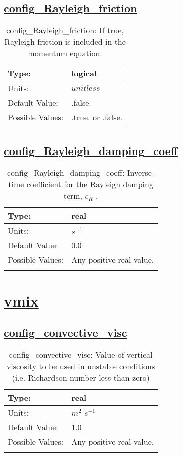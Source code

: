 \subsection[config\_Rayleigh\_friction]{\hyperref[sec:nm_tab_Rayleigh_damping]{config\_Rayleigh\_friction}}
\label{subsec:nm_sec_config_Rayleigh_friction}
\begin{center}
\begin{longtable}{| p{2.0in} | p{4.0in} |}
    \hline
    Type: & logical \\
    \hline
    Units: & $unitless$ \\
    \hline
    Default Value: & .false. \\
    \hline
    Possible Values: & .true. or .false. \\
    \hline
    \caption{config\_Rayleigh\_friction: If true, Rayleigh friction is included in the momentum equation.}
\end{longtable}
\end{center}
\subsection[config\_Rayleigh\_damping\_coeff]{\hyperref[sec:nm_tab_Rayleigh_damping]{config\_Rayleigh\_damping\_coeff}}
\label{subsec:nm_sec_config_Rayleigh_damping_coeff}
\begin{center}
\begin{longtable}{| p{2.0in} | p{4.0in} |}
    \hline
    Type: & real \\
    \hline
    Units: & $s^{-1}$ \\
    \hline
    Default Value: & 0.0 \\
    \hline
    Possible Values: & Any positive real value. \\
    \hline
    \caption{config\_Rayleigh\_damping\_coeff:  Inverse-time coefficient for the Rayleigh damping term,  $c_R$ .}
\end{longtable}
\end{center}
\section[vmix]{\hyperref[sec:nm_tab_vmix]{vmix}}
\label{sec:nm_sec_vmix}
\subsection[config\_convective\_visc]{\hyperref[sec:nm_tab_vmix]{config\_convective\_visc}}
\label{subsec:nm_sec_config_convective_visc}
\begin{center}
\begin{longtable}{| p{2.0in} | p{4.0in} |}
    \hline
    Type: & real \\
    \hline
    Units: & $m^2$ $s^{-1}$ \\
    \hline
    Default Value: & 1.0 \\
    \hline
    Possible Values: & Any positive real value. \\
    \hline
    \caption{config\_convective\_visc: Value of vertical viscosity to be used in unstable conditions (i.e. Richardson number less than zero)}
\end{longtable}
\end{center}
